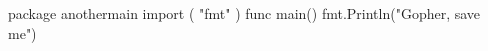 \documentclass[10pt]{article}
\begin{document}
\begin{minipage}[t]{.25\textwidth}
    \begin{codebox}
        \begin{gocode}
            package anothermain
            import (
            "fmt"
            )
            func main() {
                fmt.Println("Gopher, save me")
            }
        \end{gocode}
    \end{codebox}
\end{minipage}
\end{document}
